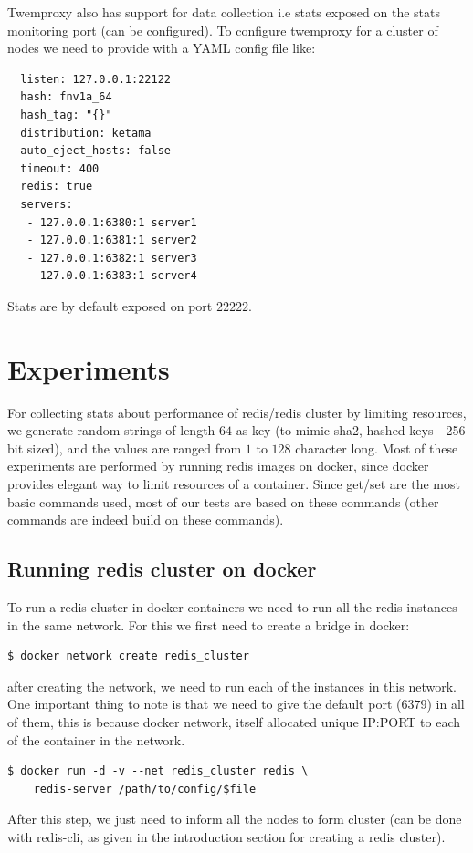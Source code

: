 \documentclass[11pt]{article}
\begin{document}
Twemproxy also has support for data collection i.e stats exposed on the
stats monitoring port (can be configured).
To configure twemproxy for a cluster of nodes we need to provide with a YAML config
file like:
\begin{file}[conf]
\begin{lstlisting}
  listen: 127.0.0.1:22122
  hash: fnv1a_64
  hash_tag: "{}"
  distribution: ketama
  auto_eject_hosts: false
  timeout: 400
  redis: true
  servers:
   - 127.0.0.1:6380:1 server1
   - 127.0.0.1:6381:1 server2
   - 127.0.0.1:6382:1 server3
   - 127.0.0.1:6383:1 server4
\end{lstlisting}
\end{file}
Stats are by default exposed on port $22222$.


\pagebreak
\section*{Experiments}
For collecting stats about performance of redis/redis cluster by limiting 
resources, we generate random strings of length $64$ as key (to mimic
sha2, hashed keys - 256 bit sized), and the values are ranged from $1$ to $128$ character long.
Most of these experiments are performed by running redis images on docker,
since docker provides elegant way to limit resources of a container.
Since get/set are the most basic commands used, most of our tests
are based on these commands (other commands are indeed build on these commands).

\subsection*{Running redis cluster on docker}
To run a redis cluster in docker containers we need to run all the redis instances in the same network. For this we first need to create a bridge in docker:
\begin{lstlisting}
$ docker network create redis_cluster
\end{lstlisting}
after creating the network, we need to run each of the instances in this network. One important thing to note is that we need to give the default port ($6379$) in all of them, this is because docker network, itself allocated unique IP:PORT to each of the container in the network.
\begin{lstlisting}
$ docker run -d -v --net redis_cluster redis \
    redis-server /path/to/config/$file
\end{lstlisting}
After this step, we just need to inform all the nodes to form cluster (can be done with redis-cli, as given in the introduction section for creating a redis cluster).
\end{document}
